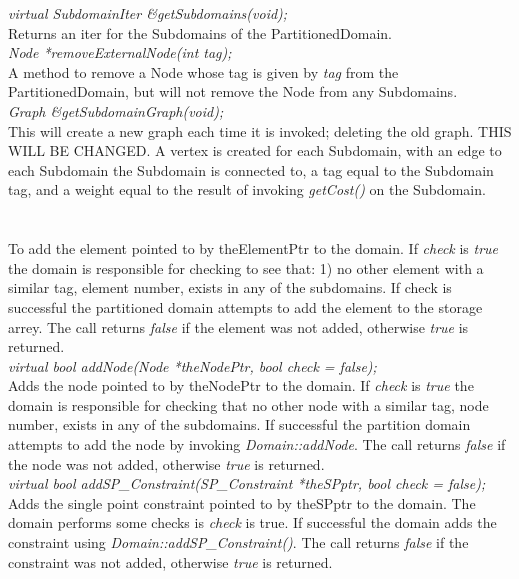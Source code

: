 {\em virtual SubdomainIter \&getSubdomains(void);} \\
Returns an iter for the Subdomains of the PartitionedDomain. \\


{\em Node *removeExternalNode(int tag); } \\
A method to remove a Node whose tag is given by {\em tag} from the PartitionedDomain, 
but will not remove the Node from any Subdomains. \\

{\em Graph \&getSubdomainGraph(void); } \\
This will create a new graph each time it is invoked; deleting the old graph. THIS WILL
BE CHANGED.  A vertex is created for each Subdomain, with an edge to each Subdomain the 
Subdomain is connected to, a tag equal to the Subdomain tag,  and a weight equal to the 
result of invoking {\em getCost()} on the Subdomain. \\

\\
  \\
To add the element pointed to by theElementPtr to the domain. If {\em check}
is {\em true} the domain is responsible for checking to see that: 1)
no other element with a similar tag, element number, exists in any of
the subdomains. If check is successful the partitioned domain
attempts to add the element to the storage arrey. The call returns
{\em false} if the element was not added, otherwise {\em true} is 
returned.\\   

{\em virtual bool addNode(Node *theNodePtr, bool check = false);}  \\
Adds the node pointed to by theNodePtr to the domain. If {\em check}
is {\em true} the domain is responsible for checking that no other
node with a similar tag, node number, exists in any of the
subdomains. If successful the partition domain attempts to add the
node by invoking {\em Domain::addNode}. The call returns {\em false} if
the node was not added, otherwise {\em true} is returned. \\  


{\em virtual bool addSP\_Constraint(SP\_Constraint *theSPptr, bool
check = false);}  \\
Adds the single point constraint pointed to by theSPptr to the 
domain. The domain performs some checks is {\em check} is true. If
successful the domain adds the constraint using {\em
Domain::addSP\_Constraint()}. The call returns {\em false} if
the constraint was not added, otherwise {\em true} is returned. \\  

